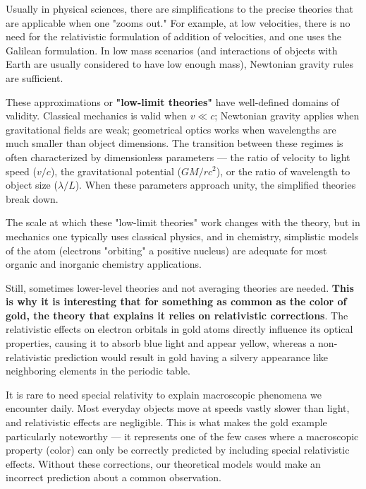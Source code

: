 \begin{commentary}
Usually in physical sciences, there are simplifications to the precise theories that are applicable when one "zooms out." For example, at low velocities, there is no need for the relativistic formulation of addition of velocities, and one uses the Galilean formulation. In low mass scenarios (and interactions of objects with Earth are usually considered to have low enough mass), Newtonian gravity rules are sufficient.

These approximations or \textbf{"low-limit theories"} have well-defined domains of validity. Classical mechanics is valid when $v \ll c$; Newtonian gravity applies when gravitational fields are weak; geometrical optics works when wavelengths are much smaller than object dimensions. The transition between these regimes is often characterized by dimensionless parameters — the ratio of velocity to light speed ($v/c$), the gravitational potential ($GM/rc^2$), or the ratio of wavelength to object size ($\lambda/L$). When these parameters approach unity, the simplified theories break down.

The scale at which these "low-limit theories" work changes with the theory, but in mechanics one typically uses classical physics, and in chemistry, simplistic models of the atom (electrons "orbiting" a positive nucleus) are adequate for most organic and inorganic chemistry applications.

Still, sometimes lower-level theories and not averaging theories are needed. \textbf{This is why it is interesting that for something as common as the color of gold, the theory that explains it relies on relativistic corrections}. The relativistic effects on electron orbitals in gold atoms directly influence its optical properties, causing it to absorb blue light and appear yellow, whereas a non-relativistic prediction would result in gold having a silvery appearance like neighboring elements in the periodic table.

It is rare to need special relativity to explain macroscopic phenomena we encounter daily. Most everyday objects move at speeds vastly slower than light, and relativistic effects are negligible. This is what makes the gold example particularly noteworthy — it represents one of the few cases where a macroscopic property (color) can only be correctly predicted by including special relativistic effects. Without these corrections, our theoretical models would make an incorrect prediction about a common observation.
\end{commentary}

